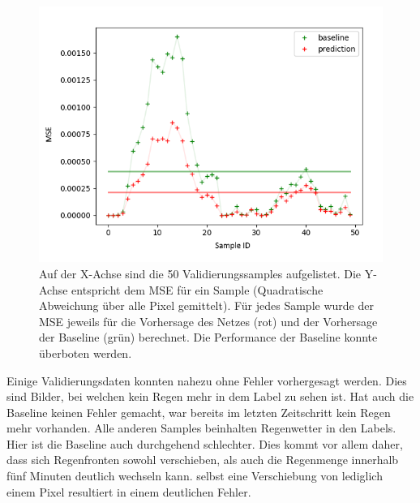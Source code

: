 \begin{figure}[h]
	\centering
	\includegraphics[width=\linewidth]{pics/mse_baseline}
	\caption[Vergleich zwischen Baseline und Netzvorhersage.]{Auf der X-Achse sind die 50 Validierungssamples aufgelistet. Die Y-Achse entspricht dem MSE für ein Sample (Quadratische Abweichung über alle Pixel gemittelt). Für jedes Sample wurde der MSE jeweils für die Vorhersage des Netzes (rot) und der Vorhersage der Baseline (grün) berechnet. Die Performance der Baseline konnte überboten werden.}
	\label{vglBaseline1}
\end{figure}

Einige Validierungsdaten konnten nahezu ohne Fehler vorhergesagt werden. Dies sind Bilder, bei welchen kein Regen mehr in dem Label zu sehen ist. Hat auch die Baseline keinen Fehler gemacht, war bereits im letzten Zeitschritt kein Regen mehr vorhanden. Alle anderen Samples beinhalten Regenwetter in den Labels. Hier ist die Baseline auch durchgehend schlechter. Dies kommt vor allem daher, dass sich Regenfronten sowohl verschieben, als auch die Regenmenge innerhalb fünf Minuten deutlich wechseln kann. selbst eine Verschiebung von lediglich einem Pixel resultiert in einem deutlichen Fehler.

